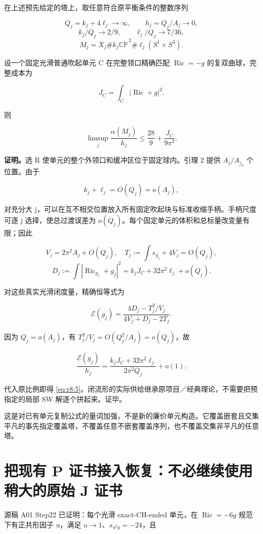 \documentclass[UTF8,11pt,openany,oneside,fontset=none]{ctexbook}
\begin{document}
在上述预先给定的塔上，取任意符合原平衡条件的整数序列

\[
Q_j=k_j+4\ell_j\to\infty,\qquad h_j=Q_j/A_j\to0,
\] \[
k_j/Q_j\to2/9,\qquad \ell_j/Q_j\to7/36,
\] \[
M_j=X_j\#k_j\overline{\mathbb{CP}}^{\,2}
\#\ell_j(S^1\times S^3).
\]

设一个固定光滑普通吹起单元 C 在完整领口精确匹配 \(\operatorname{Ric}=-g\) 的复双曲球，完整成本为

\[
J_C=\int_C|\operatorname{Ric}+g|^2.
\]

则

\[
\boxed{\limsup_j\frac{\alpha(M_j)}{h_j}
\le\frac{28}{9}+\frac{J_C}{9\pi^2}.}
\tag{8.5}\label{eq:r8:5}
\]

\textbf{证明。}选 R 使单元的整个外领口和缓冲区位于固定球内。引理 2 提供 \(A_j/A_{j_0}\) 个位置。由于

\[
k_j+\ell_j=O(Q_j)=o(A_j),
\]

对充分大 j，可以在互不相交位置放入所有固定吹起块与标准收缩手柄。手柄尺度可逐 j 选择，使总过渡误差为 \(o(Q_j)\)。每个固定单元的体积和总标量改变量有限；因此

\[
V_j=2\pi^2A_j+O(Q_j),\quad
T_j:=\int s_{g_j}+4V_j=O(Q_j),
\] \[
D_j:=\int|\operatorname{Ric}_{g_j}+g_j|^2
=k_jJ_C+32\pi^2\ell_j+o(Q_j).
\]

对这些真实光滑闭度量，精确恒等式为

\[
\mathcal E(g_j)=
\frac{4D_j-T_j^2/V_j}{4V_j+D_j-2T_j}.
\tag{8.6}\label{eq:r8:6}
\]

因为 \(Q_j=o(A_j)\)，有 \(T_j^2/V_j=O(Q_j^2/A_j)=o(Q_j)\)，故

\[
\frac{\mathcal E(g_j)}{h_j}
=\frac{k_jJ_C+32\pi^2\ell_j}{2\pi^2Q_j}+o(1).
\]

代入原比例即得 \eqref{eq:r8:5}。闭流形的实际供给继承原项目／经典理论，不需要把预指定的局部 SW 解逐个拼起来。证毕。

这是对已有单元复制公式的量词加强，不是新的廉价单元构造。它覆盖嵌套且交集平凡的事先指定覆盖塔，不覆盖任意不嵌套覆盖序列，也不覆盖交集非平凡的任意塔。

\section{把现有 P 证书接入恢复：不必继续使用稍大的原始 J 证书}\label{ch8:ux628aux73b0ux6709-p-ux8bc1ux4e66ux63a5ux5165ux6062ux590dux4e0dux5fc5ux7ee7ux7eedux4f7fux7528ux7a0dux5927ux7684ux539fux59cb-j-ux8bc1ux4e66}

源稿 A01 Step22 已证明：每个光滑 exact-CH-ended 单元，在 \(\operatorname{Ric}=-6g\) 规范下有正共形因子 u，满足 \(u\to1\)、\(s_{u^2g}=-24\)，且
\end{document}
